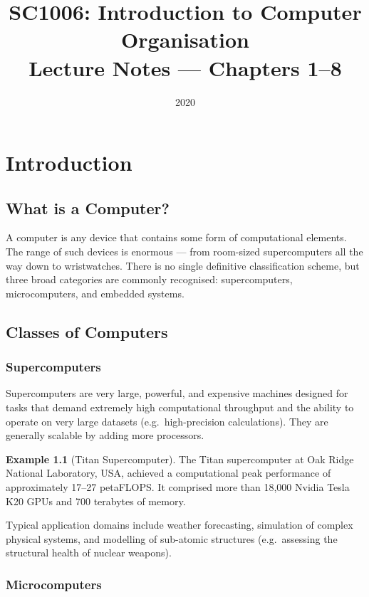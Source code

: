 \documentclass[11pt, a4paper, notitlepage]{report}
\title{\textbf{SC1006: Introduction to Computer Organisation}\\[0.5em]
       \large Lecture Notes --- Chapters 1--8}
\author{}
\date{2020}
\makeatletter
\theoremstyle{definition}
\theoremstyle{remark}
\theoremstyle{definition}
\newtheorem{example}[theorem]{Example}
\renewcommand\tableofcontents{%
  \section*{\contentsname}%
  \@starttoc{toc}%
}
\makeatother
\begin{document}
\maketitle
\tableofcontents
\newpage


\chapter{Introduction}

\section{What is a Computer?}

A computer is any device that contains some form of computational elements. The range of such devices is enormous --- from room-sized supercomputers all the way down to wristwatches. There is no single definitive classification scheme, but three broad categories are commonly recognised: supercomputers, microcomputers, and embedded systems.

\section{Classes of Computers}

\subsection{Supercomputers}

Supercomputers are very large, powerful, and expensive machines designed for tasks that demand extremely high computational throughput and the ability to operate on very large datasets (e.g.\ high-precision calculations). They are generally scalable by adding more processors.

\begin{example}[Titan Supercomputer]
The Titan supercomputer at Oak Ridge National Laboratory, USA, achieved a computational peak performance of approximately 17--27 petaFLOPS. It comprised more than 18,000 Nvidia Tesla K20 GPUs and 700 terabytes of memory.
\end{example}

Typical application domains include weather forecasting, simulation of complex physical systems, and modelling of sub-atomic structures (e.g.\ assessing the structural health of nuclear weapons).

\subsection{Microcomputers}
\end{document}
